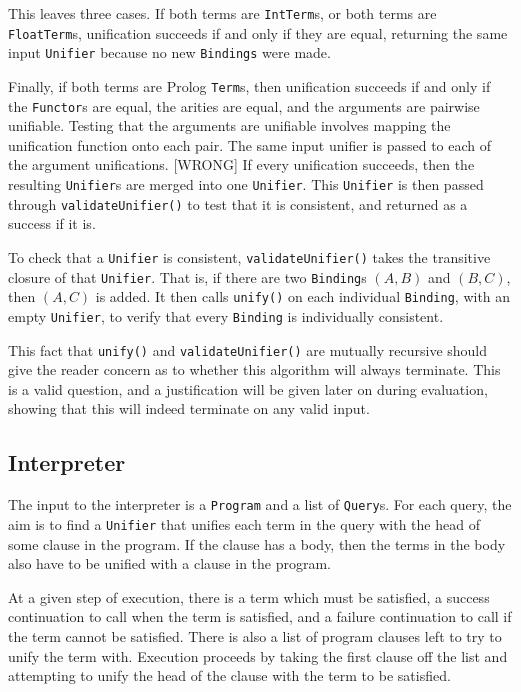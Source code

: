 \documentclass[12pt]{article}
\begin{document}
This leaves three cases. 
If both terms are \verb|IntTerm|s, or both terms are \verb|FloatTerm|s, unification succeeds if and only if they are equal, returning the same input \verb|Unifier| because no new \verb|Bindings| were made. 

Finally, if both terms are Prolog \verb|Term|s, then unification succeeds if and only if the \verb|Functor|s are equal, the arities are equal, and the arguments are pairwise unifiable. 
Testing that the arguments are unifiable involves mapping the unification function onto each pair. 
The same input unifier is passed to each of the argument unifications. [WRONG]
If every unification succeeds, then the resulting \verb|Unifier|s are merged into one \verb|Unifier|. 
This \verb|Unifier| is then passed through \verb|validateUnifier()| to test that it is consistent, and returned as a success if it is.

To check that a \verb|Unifier| is consistent, \verb|validateUnifier()| takes the transitive closure of that \verb|Unifier|. 
That is, if there are two \verb|Binding|s $(A, B)$ and $(B, C)$, then $(A, C)$ is added. 
It then calls \verb|unify()| on each individual \verb|Binding|, with an empty \verb|Unifier|, to verify that every \verb|Binding| is individually consistent.

This fact that \verb|unify()| and \verb|validateUnifier()| are mutually recursive should give the reader concern as to whether this algorithm will always terminate. 
This is a valid question, and a justification will be given later on during evaluation, showing that this will indeed terminate on any valid input.

\subsection{Interpreter}

The input to the interpreter is a \verb|Program| and a list of \verb|Query|s. 
For each query, the aim is to find a \verb|Unifier| that unifies each term in the query with the head of some clause in the program. 
If the clause has a body, then the terms in the body also have to be unified with a clause in the program.

At a given step of execution, there is a term which must be satisfied, a success continuation to call when the term is satisfied, and a failure continuation to call if the term cannot be satisfied. There is also a list of program clauses left to try to unify the term with. 
Execution proceeds by taking the first clause off the list and attempting to unify the head of the clause with the term to be satisfied. 
\end{document}
